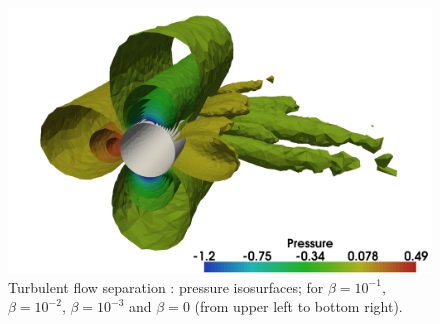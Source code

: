 \begin{figure}
  \includegraphics[width=\twofigs]{chapters/hoffman-1/png/Hoffman_fig3d.png}
  \caption{Turbulent flow separation \citep{HoffmanJansson2009}: pressure
    isosurfaces; for $\beta = 10^{-1}$, $\beta = 10^{-2}$, $\beta = 10^{-3}$
    and $\beta = 0$ (from upper left to bottom right).}
  \label{hoffman-1:fig:2}
\end{figure}

